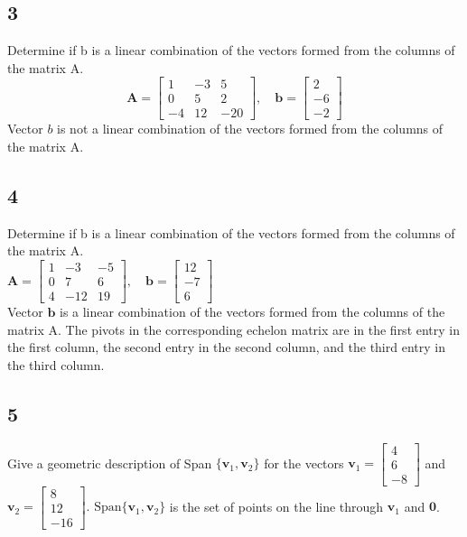 \documentclass{article}
\begin{document}
\subsection*{3}
Determine if b is a linear combination of the vectors formed from the columns of the matrix A.
\[\mathbf{A} =\left[\begin{array}{ccc}1 & -3 & 5 \\0 & 5 & 2 \\-4 & 12 & -20\end{array}\right],\quad\mathbf{b} =\left[\begin{array}{c}2 \\-6 \\-2\end{array}\right]\]
Vector $b$ is not a linear combination of the vectors formed from the columns of the matrix A.
\subsection*{4}
Determine if b is a linear combination of the vectors formed from the columns of the matrix A.
\\[0.1in]$ \mathbf{A} = \left[ \begin{array}{ccc} 1 & -3 & -5 \\ 0 & 7 & 6 \\ 4 & -12 & 19 \end{array} \right], \quad \mathbf{b} = \left[ \begin{array}{c} 12 \\ -7 \\ 6 \end{array} \right] $
\\Vector $\mathbf{ b}$ is a linear combination of the vectors formed from the columns of the matrix A. The pivots in the corresponding echelon matrix are in the first entry in the first column, the second entry in the second column, and the third entry in the third column.
\subsection*{5}
Give a geometric description of Span $\{\mathbf{v}_1, \mathbf{v}_2\}$ for the vectors 
$\mathbf{v}_1 = \begin{bmatrix} 4 \\ 6 \\ -8 \end{bmatrix}$ and 
$\mathbf{v}_2 = \begin{bmatrix} 8 \\ 12 \\ -16 \end{bmatrix}.$
$\text{Span} \{\mathbf{v}_1, \mathbf{v}_2\}$ is the set of points on the line through $\mathbf{v}_1$ and $\mathbf{0}$.
\end{document}
